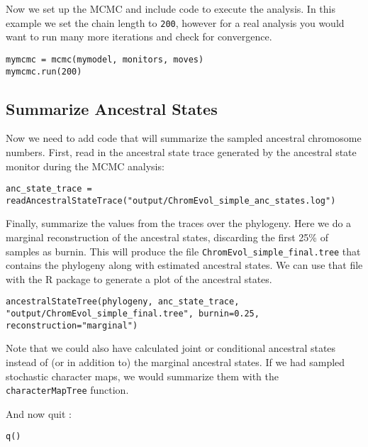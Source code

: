 Now we set up the MCMC and include code to execute the analysis. In this example we set the chain length to \texttt{200}, however
for a real analysis you would want to run many more iterations and check for convergence.
{\tt \begin{snugshade*}
\begin{lstlisting}
mymcmc = mcmc(mymodel, monitors, moves)
mymcmc.run(200)
\end{lstlisting}
\end{snugshade*}}


\medskip
\subsection{Summarize Ancestral States}

Now we need to add \Rev code that will summarize the sampled ancestral chromosome
numbers. First, read in the ancestral state trace generated by the ancestral state
monitor during the MCMC analysis:
{\tt \begin{snugshade*}
\begin{lstlisting}
anc_state_trace = readAncestralStateTrace("output/ChromEvol_simple_anc_states.log")
\end{lstlisting}
\end{snugshade*}}

Finally, summarize the values from the traces over the phylogeny.
Here we do a marginal reconstruction of the ancestral states, discarding the first 25\% of samples
as burnin. This will produce the file \texttt{ChromEvol\_simple\_final.tree} that contains
the phylogeny along with estimated ancestral states. 
We can use that file with the \RevGadgets R package to generate a plot of the ancestral states.

{\tt \begin{snugshade*}
\begin{lstlisting}
ancestralStateTree(phylogeny, anc_state_trace, "output/ChromEvol_simple_final.tree", burnin=0.25, reconstruction="marginal")
\end{lstlisting}
\end{snugshade*}}
Note that we could also have calculated joint or conditional ancestral states instead of (or in
addition to) the marginal ancestral states.
If we had sampled stochastic character maps, we would summarize them with the \texttt{characterMapTree}
function.


And now quit \RevBayes:
{\tt \begin{snugshade*}
\begin{lstlisting}
q()
\end{lstlisting}
\end{snugshade*}}

